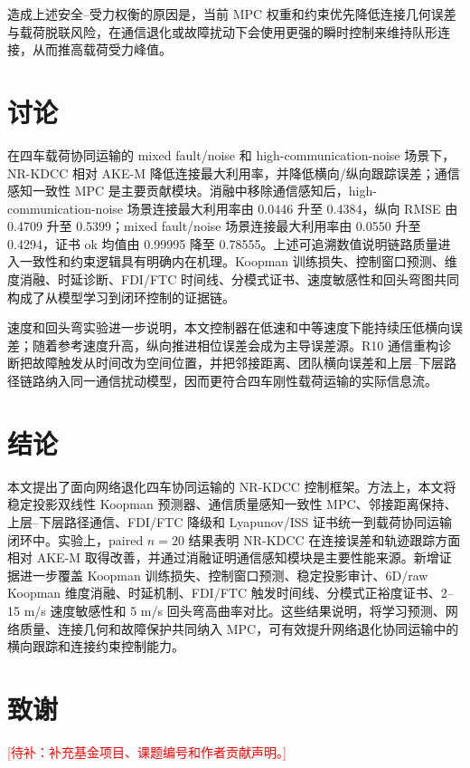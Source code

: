 \documentclass[twocolumn,3p,times,procedia]{elsarticle}
\newcommand{\todozh}[1]{\textcolor{red}{[待补：#1]}}
\newif\ifNRReview
\newcommand{\reviewblock}[1]{\ifNRReview\par\smallskip\noindent\begingroup\setlength{\fboxsep}{4pt}\colorbox{yellow!35}{\parbox{0.96\linewidth}{\footnotesize\textbf{当前不足：} #1}}\endgroup\par\smallskip\fi}
\newcommand{\AKE}{AKE-M}
\newcommand{\Method}{NR-KDCC}
\begin{document}
造成上述安全--受力权衡的原因是，当前 MPC 权重和约束优先降低连接几何误差与载荷脱联风险，在通信退化或故障扰动下会使用更强的瞬时控制来维持队形连接，从而推高载荷受力峰值。
\reviewblock{受力指标尚未形成正向贡献；后续应补充 $F_x,F_y,M_z$ 分量图和力平滑权重消融。}

\FloatBarrier

\section{讨论}

在四车载荷协同运输的 mixed fault/noise 和 high-communication-noise 场景下，\Method{} 相对 \AKE{} 降低连接最大利用率，并降低横向/纵向跟踪误差；通信感知一致性 MPC 是主要贡献模块。消融中移除通信感知后，high-communication-noise 场景连接最大利用率由 0.0446 升至 0.4384，纵向 RMSE 由 0.4709 升至 0.5399；mixed fault/noise 场景连接最大利用率由 0.0550 升至 0.4294，证书 ok 均值由 0.99995 降至 0.78555。上述可追溯数值说明链路质量进入一致性和约束逻辑具有明确内在机理。Koopman 训练损失、控制窗口预测、维度消融、时延诊断、FDI/FTC 时间线、分模式证书、速度敏感性和回头弯图共同构成了从模型学习到闭环控制的证据链。

速度和回头弯实验进一步说明，本文控制器在低速和中等速度下能持续压低横向误差；随着参考速度升高，纵向推进相位误差会成为主导误差源。R10 通信重构诊断把故障触发从时间改为空间位置，并把邻接距离、团队横向误差和上层--下层路径链路纳入同一通信扰动模型，因而更符合四车刚性载荷运输的实际信息流。

\reviewblock{投稿前主要缺口包括：严格 AKE-A 复现或强物理/DMPC baseline；delay/dropout dose-response 与 topology recovery；FDI/FTC 多 seed 检测延迟、误报率和切换延迟统计；受力 $F_x,F_y,M_z$ 分量和力平滑权重消融；R10 的逐点严格优于 baseline 目标尚未闭合。}

\section{结论}

本文提出了面向网络退化四车协同运输的 \Method{} 控制框架。方法上，本文将稳定投影双线性 Koopman 预测器、通信质量感知一致性 MPC、邻接距离保持、上层--下层路径通信、FDI/FTC 降级和 Lyapunov/ISS 证书统一到载荷协同运输闭环中。实验上，paired $n=20$ 结果表明 \Method{} 在连接误差和轨迹跟踪方面相对 \AKE{} 取得改善，并通过消融证明通信感知模块是主要性能来源。新增证据进一步覆盖 Koopman 训练损失、控制窗口预测、稳定投影审计、6D/raw Koopman 维度消融、时延机制、FDI/FTC 触发时间线、分模式正裕度证书、2--15 m/s 速度敏感性和 5 m/s 回头弯高曲率对比。这些结果说明，将学习预测、网络质量、连接几何和故障保护共同纳入 MPC，可有效提升网络退化协同运输中的横向跟踪和连接约束控制能力。

\section*{致谢}

\todozh{补充基金项目、课题编号和作者贡献声明。}

\FloatBarrier
\balance


\end{document}
